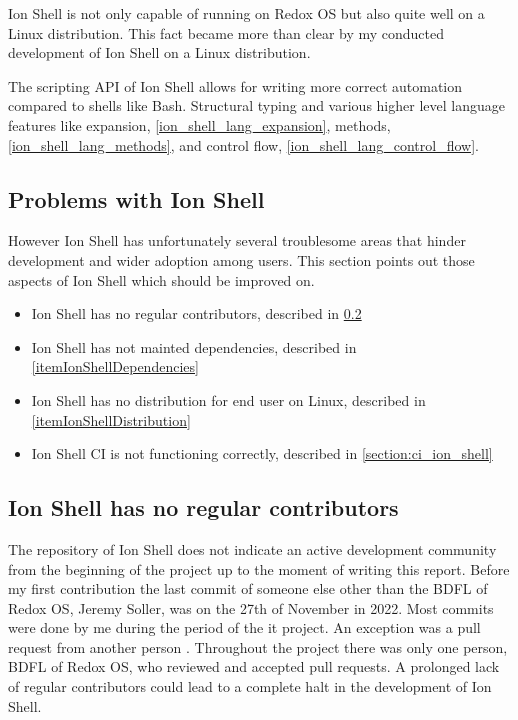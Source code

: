 Ion Shell is not only capable of running on Redox OS but also quite well on a Linux distribution.
This fact became more than clear by my conducted development of Ion Shell on a Linux distribution.

The scripting API of Ion Shell allows for writing more correct automation compared to shells like Bash.
Structural typing and various higher level language features like expansion, \ref{ion_shell_lang_expansion}, methods, \ref{ion_shell_lang_methods}, and control flow, \ref{ion_shell_lang_control_flow}.

\subsection{Problems with Ion Shell}\label{label:problems_ion_shell}

However Ion Shell has unfortunately several troublesome areas
that hinder development and wider adoption among users.
This section points out those aspects of Ion Shell which should be improved on.

\newcommand{\itemIonShellRegularContributor}{Ion Shell has no regular contributors}
\newcommand{\itemIonShellCI}{Ion Shell CI is not functioning correctly}
\newcommand{\itemIonShellDistribution}{Ion Shell has no distribution for end user on Linux}
\newcommand{\itemIonShellDependencies}{Ion Shell has not mainted dependencies}

\begin{itemize}
	\item \itemIonShellRegularContributor, described in \ref{itemIonShellRegularContributor}
	\item \itemIonShellDependencies, described in \ref{itemIonShellDependencies}
	\item \itemIonShellDistribution, described in \ref{itemIonShellDistribution}
	\item \itemIonShellCI, described in \ref{section:ci_ion_shell}
\end{itemize}

\subsection{\itemIonShellRegularContributor}\label{itemIonShellRegularContributor}

The repository of Ion Shell does not indicate an active development community
from the beginning of the project up to the moment of writing this report.
Before my first contribution
the last commit of someone else other than the BDFL of Redox OS, Jeremy Soller,
was on the 27th of November in 2022.
Most commits were done by me during the period of the it project.
An exception was a pull request from another person \cite{pr_ion_shell_global_alias}.
Throughout the project there was only one person, BDFL of Redox OS, who reviewed and accepted pull requests.
A prolonged lack of regular contributors could lead to a complete halt in the development of Ion Shell.

